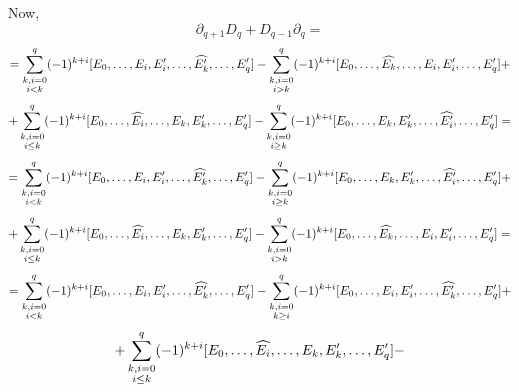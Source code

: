 \documentclass[8pt]{article} %
\begin{document}
\begin{enumerate}[label=\bfseries \arabic*.]
{		Now,
		\[\partial_{q+1}D_q+D_{q-1}\partial_q=\]
		\[=\sum_{\begin{subarray}{c}k,i=0\\i< k\end{subarray}}^q(-1)^{k+i}[E_0,\dots,E_i,E_i',\dots,\widehat{E_{k}'},\dots,E_q']-
		\sum_{\begin{subarray}{c}k,i=0\\i>k\end{subarray}}^q(-1)^{k+i}[E_0,\dots,\widehat{E_{k}},\dots,E_{i},E_{i}',\dots,E_q']+\]
		\[+\sum_{\begin{subarray}{c}k,i=0\\i\leq k\end{subarray}}^q(-1)^{k+i}[E_0,\dots,\widehat{E_i},\dots,E_k,E_k',\dots,E_q']-
		\sum_{\begin{subarray}{c}k,i=0\\i\geq k\end{subarray}}^q(-1)^{k+i}[E_0,\dots,E_k,E_k',\dots,\widehat{E_{i}'},\dots,E_q']=\]
		\[=\sum_{\begin{subarray}{c}k,i=0\\i< k\end{subarray}}^q(-1)^{k+i}[E_0,\dots,E_i,E_i',\dots,\widehat{E_{k}'},\dots,E_q']-
		\sum_{\begin{subarray}{c}k,i=0\\i\geq k\end{subarray}}^q(-1)^{k+i}[E_0,\dots,E_k,E_k',\dots,\widehat{E_{i}'},\dots,E_q']+\]
		\[+\sum_{\begin{subarray}{c}k,i=0\\i\leq k\end{subarray}}^q(-1)^{k+i}[E_0,\dots,\widehat{E_i},\dots,E_k,E_k',\dots,E_q']-
		\sum_{\begin{subarray}{c}k,i=0\\i>k\end{subarray}}^q(-1)^{k+i}[E_0,\dots,\widehat{E_{k}},\dots,E_{i},E_{i}',\dots,E_q']=\]
		\[=\sum_{\begin{subarray}{c}k,i=0\\i< k\end{subarray}}^q(-1)^{k+i}[E_0,\dots,E_i,E_i',\dots,\widehat{E_{k}'},\dots,E_q']-
		\sum_{\begin{subarray}{c}k,i=0\\k\geq i\end{subarray}}^q(-1)^{k+i}[E_0,\dots,E_i,E_i',\dots,\widehat{E_{k}'},\dots,E_q']+\]
		\[+\sum_{\begin{subarray}{c}k,i=0\\i\leq k\end{subarray}}^q(-1)^{k+i}[E_0,\dots,\widehat{E_i},\dots,E_k,E_k',\dots,E_q']-
\]}
\end{enumerate}
\end{document}
